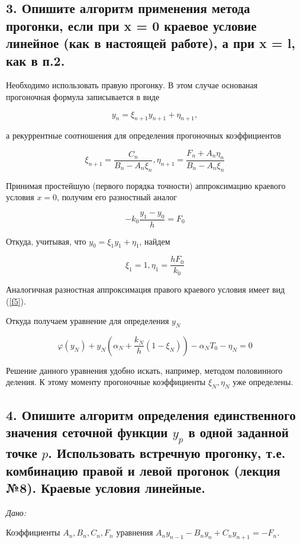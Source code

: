 \documentclass[a4paper,12pt]{article}
\begin{document}
	\subsection*{3. Опишите алгоритм применения метода прогонки, если при x = 0 краевое условие линейное (как в настоящей работе), а при x = l, как в п.2.}
	
	
	Необходимо использовать правую прогонку. В этом случае основаная прогоночная формула записывается в виде
	
	\begin{equation}\label{f3}
	y_n = \xi_{n+1} y_{n+1}+\eta_{n+1},
	\end{equation}
	
	а рекуррентные соотношения для определения прогоночных коэффициентов
	
	 \[\xi_{n+1}=\frac{C_n}{B_n-A_n\xi_n}, \eta_{n+1}=\frac{F_n+A_n\eta_n}{B_n-A_n\xi_n}\]
	 
	 Принимая простейшую (первого порядка точности) аппроксимацию краевого условия $x = 0$, получим его разностный аналог
	 
	 \[-k_0\frac{y_1 - y_0}{h} = F_0\]
	 
	 Откуда, учитывая, что $y_0 = \xi_{1} y_{1}+\eta_{1}$, найдем
	 
	 \[\xi_1 = 1, \eta_1 = \frac{hF_0}{k_0}\]
	 
	 Аналогичная разностная аппроксимация правого краевого условия имеет вид (\ref{f5}).
	 
	 Откуда получаем уравнение для определения $y_N$
	 
	 \begin{equation}\label{f6}
	 \varphi(y_N) + y_N(\alpha_N + \frac{k_N}{h}(1 - \xi_N)) - \alpha_N T_0 - \eta_{N} = 0
	 \end{equation}
	 
	Решение данного уравнения удобно искать, например, методом половинного деления. К этому моменту прогоночные коэффициенты $\xi_N, \eta_N$ уже определены.
	 
	
	
	\subsection*{4. Опишите алгоритм определения единственного значения сеточной функции $y_p$ в одной заданной точке $p$. Использовать встречную прогонку, т.е. комбинацию правой и левой прогонок (лекция №8). Краевые условия линейные.}
	
	\textit{Дано:}
	
	Коэффициенты $A_n, B_n, C_n, F_n$ уравнения $A_n y_{n - 1} - B_n y_n + C_n y_{n + 1} = -F_n$.
	
\end{document}
